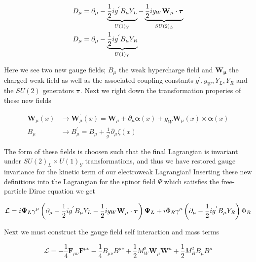 \begin{align} 
\label{eq:qed:left} 
D_\mu &= \partial_{\mu}
- \underbrace{\frac{1}{2}ig^{'}B_{\mu}Y_{L}}_{U(1)_Y} -
  \underbrace{\frac{1}{2}ig_{W}\bf{W}_\mu \cdot \boldsymbol{\tau}}_{SU(2)_L} \\
\label{eq:qed:right} 
D_\mu &= \partial_{\mu}  - \underbrace{\frac{1}{2}ig^{'}B_{\mu}Y_{R}}_{U(1)_Y} 
\end{align}

Here we see two new gauge fields; $B_\mu$ the weak hypercharge field and
$\boldsymbol{W_\mu}$ the charged weak field as well as the associated coupling
constants $g^{'}, g_{W}, Y_{L}, Y_{R}$ and the $SU(2)$ generators
$\boldsymbol{\tau}$.   Next we right down the transformation properies of these
new fields 

\begin{align}
\boldsymbol{W}_{\mu}(x) &\rightarrow \boldsymbol{W}_{\mu}^{'}(x) =
\boldsymbol{W}_{\mu} + \partial_{\mu} \boldsymbol{\alpha}(x) +
g_{W}\boldsymbol{W}_{\mu}(x) \times \boldsymbol{\alpha}(x)
\\ 
B_{\mu} &\rightarrow B_{\mu}^{'} = B_{\mu} +
\frac{1}{g^{'}}\partial_{\mu}\zeta(x)
\end{align}

The form of these fields is choosen such that the final Lagrangian is invariant
under $SU(2)_L \times U(1)_Y$ transformations, and thus we have restored gauge
invariance for the kinetic term of our electroweak Lagrangian!  Inserting these
new definitions into the Lagrangian for the spinor field $\Psi$ which satisfies
the free-particle Dirac equation we get

\begin{equation} \label{eq:qed:fermion_lagrangian}
\mathcal{L} = i\boldsymbol{\bar{\Psi}_L}\gamma^{\mu} \left( \partial_{\mu}
- \frac{1}{2}ig^{'}B_{\mu}Y_{L} - \frac{1}{2}ig_{W}\bf{W}_\mu \cdot
  \boldsymbol{\tau} \right) \boldsymbol{\Psi_L} + i \bar{\Phi}_{R}\gamma^{\mu}
\left(\partial_{\mu} - \frac{1}{2}ig^{'}B_{\mu}Y_{R} \right) \Phi_{R}
\end{equation}

Next we must construct the gauge field self interaction and mass terms

\begin{equation} \label{eq:qed:gauge_lagrangian}
\mathcal{L} = -\frac{1}{4}\boldsymbol{F}_{\mu\nu}\boldsymbol{F}^{\mu\nu}
-\frac{1}{4}B_{\mu\nu}B^{\mu\nu} +
\frac{1}{2}M_{W}^{2}\boldsymbol{W}_{\mu}\boldsymbol{W}^{\mu} +
\frac{1}{2}M_{B}^{2}B_{\mu}B^{\mu}
\end{equation}

